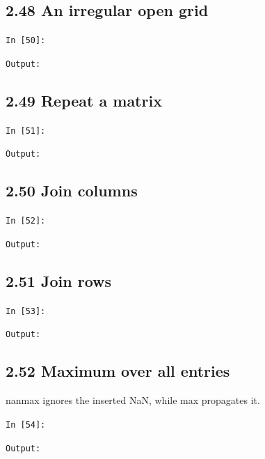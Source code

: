 \documentclass[11pt]{article}
\begin{document}
\par\medskip\noindent\begin{minipage}{\linewidth}
\subsection*{2.48 An irregular open grid}
\noindent\texttt{In [50]:}

\noindent\texttt{Output:}

\end{minipage}\par

\par\medskip\noindent\begin{minipage}{\linewidth}
\subsection*{2.49 Repeat a matrix}
\noindent\texttt{In [51]:}

\noindent\texttt{Output:}

\end{minipage}\par

\par\medskip\noindent\begin{minipage}{\linewidth}
\subsection*{2.50 Join columns}
\noindent\texttt{In [52]:}

\noindent\texttt{Output:}

\end{minipage}\par

\par\medskip\noindent\begin{minipage}{\linewidth}
\subsection*{2.51 Join rows}
\noindent\texttt{In [53]:}

\noindent\texttt{Output:}

\end{minipage}\par

\par\medskip\noindent\begin{minipage}{\linewidth}
\subsection*{2.52 Maximum over all entries}
nanmax ignores the inserted NaN, while max propagates it.

\noindent\texttt{In [54]:}

\noindent\texttt{Output:}

\end{minipage}\par
\end{document}
